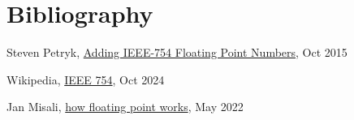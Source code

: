 \documentclass[a4paper,10pt]{article}
\begin{document}
    \section{Bibliography}
    \begin{thebibliography}{9}
        Steven Petryk,
        \href{https://www.youtube.com/watch?v=mKJiD2ZAlwM}{Adding IEEE-754 Floating Point Numbers},
        Oct 2015

        Wikipedia,
        \href{https://en.wikipedia.org/wiki/IEEE_754}{IEEE 754},
        Oct 2024

        Jan Misali,
        \href{https://www.youtube.com/watch?v=dQhj5RGtag0}{how floating point works},
        May 2022
    \end{thebibliography}
\end{document}
